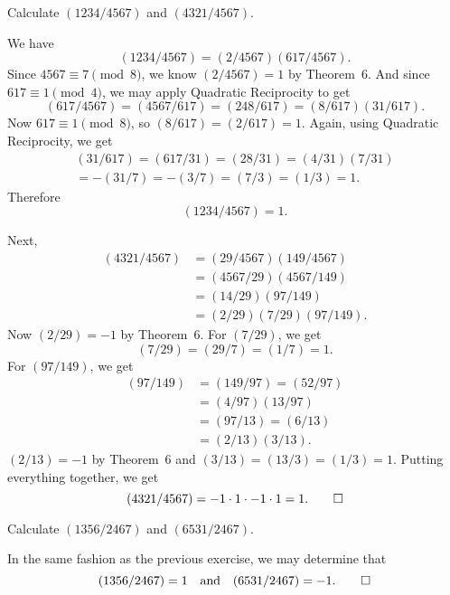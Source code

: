  Calculate $(1234/4567)$ and $(4321/4567)$.
\begin{solution}
  We have
  \begin{equation*}
    (1234/4567) = (2/4567)(617/4567).
  \end{equation*}
  Since $4567\equiv7\pmod8$, we know $(2/4567) = 1$ by Theorem~6. And
  since $617\equiv1\pmod4$, we may apply Quadratic Reciprocity to get
  \begin{equation*}
    (617/4567) = (4567/617) = (248/617) = (8/617)(31/617).
  \end{equation*}
  Now $617\equiv1\pmod8$, so $(8/617) = (2/617) = 1$. Again, using
  Quadratic Reciprocity, we get
  \begin{multline*}
    (31/617) = (617/31) = (28/31) = (4/31)(7/31) \\
    = -(31/7) = -(3/7) = (7/3) = (1/3) = 1.
  \end{multline*}
  Therefore
  \begin{equation*}
    (1234/4567) = 1.
  \end{equation*}

  Next,
  \begin{align*}
    (4321/4567) &= (29/4567)(149/4567) \\
                &= (4567/29)(4567/149) \\
                &= (14/29)(97/149) \\
                &= (2/29)(7/29)(97/149).
  \end{align*}
  Now $(2/29) = -1$ by Theorem~6. For $(7/29)$, we get
  \begin{equation*}
    (7/29) = (29/7) = (1/7) = 1.
  \end{equation*}
  For $(97/149)$, we get
  \begin{align*}
    (97/149) &= (149/97) = (52/97) \\
             &= (4/97)(13/97) \\
             &= (97/13) = (6/13) \\
             &= (2/13)(3/13).
  \end{align*}
  $(2/13) = -1$ by Theorem~6 and $(3/13) = (13/3) = (1/3) =
  1$. Putting everything together, we get
  \begin{equation*}
    (4321/4567) = -1\cdot1\cdot-1\cdot1 = 1. \qedhere
  \end{equation*}
\end{solution}

 Calculate $(1356/2467)$ and $(6531/2467)$.
\begin{solution}
  In the same fashion as the previous exercise, we may determine that
  \begin{equation*}
    (1356/2467) = 1
    \quad\text{and}\quad
    (6531/2467) = -1. \qedhere
  \end{equation*}
\end{solution}

